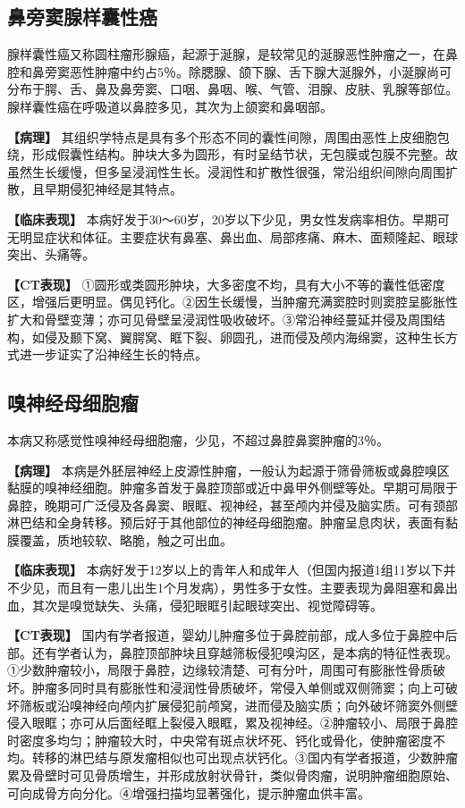 \subsection{鼻旁窦腺样囊性癌}

腺样囊性癌又称圆柱瘤形腺癌，起源于涎腺，是较常见的涎腺恶性肿瘤之一，在鼻腔和鼻旁窦恶性肿瘤中约占5％。除腮腺、颌下腺、舌下腺大涎腺外，小涎腺尚可分布于腭、舌、鼻及鼻旁窦、口咽、鼻咽、喉、气管、泪腺、皮肤、乳腺等部位。腺样囊性癌在呼吸道以鼻腔多见，其次为上颌窦和鼻咽部。

\textbf{【病理】}
其组织学特点是具有多个形态不同的囊性间隙，周围由恶性上皮细胞包绕，形成假囊性结构。肿块大多为圆形，有时呈结节状，无包膜或包膜不完整。故虽然生长缓慢，但多呈浸润性生长。浸润性和扩散性很强，常沿组织间隙向周围扩散，且早期侵犯神经是其特点。

\textbf{【临床表现】}
本病好发于30～60岁，20岁以下少见，男女性发病率相仿。早期可无明显症状和体征。主要症状有鼻塞、鼻出血、局部疼痛、麻木、面颊隆起、眼球突出、头痛等。

\textbf{【CT表现】}
①圆形或类圆形肿块，大多密度不均，具有大小不等的囊性低密度区，增强后更明显。偶见钙化。②因生长缓慢，当肿瘤充满窦腔时则窦腔呈膨胀性扩大和骨壁变薄；亦可见骨壁呈浸润性吸收破坏。③常沿神经蔓延并侵及周围结构，如侵及颞下窝、翼腭窝、眶下裂、卵圆孔，进而侵及颅内海绵窦，这种生长方式进一步证实了沿神经生长的特点。

\subsection{嗅神经母细胞瘤}

本病又称感觉性嗅神经母细胞瘤，少见，不超过鼻腔鼻窦肿瘤的3％。

\textbf{【病理】}
本病是外胚层神经上皮源性肿瘤，一般认为起源于筛骨筛板或鼻腔嗅区黏膜的嗅神经细胞。肿瘤多首发于鼻腔顶部或近中鼻甲外侧壁等处。早期可局限于鼻腔，晚期可广泛侵及各鼻窦、眼眶、视神经，甚至颅内并侵及脑实质。可有颈部淋巴结和全身转移。预后好于其他部位的神经母细胞瘤。肿瘤呈息肉状，表面有黏膜覆盖，质地较软、略脆，触之可出血。

\textbf{【临床表现】}
本病好发于12岁以上的青年人和成年人（但国内报道1组11岁以下并不少见，而且有一患儿出生1个月发病），男性多于女性。主要表现为鼻阻塞和鼻出血，其次是嗅觉缺失、头痛，侵犯眼眶引起眼球突出、视觉障碍等。

\textbf{【CT表现】}
国内有学者报道，婴幼儿肿瘤多位于鼻腔前部，成人多位于鼻腔中后部。还有学者认为，鼻腔顶部肿块且穿越筛板侵犯嗅沟区，是本病的特征性表现。①少数肿瘤较小，局限于鼻腔，边缘较清楚、可有分叶，周围可有膨胀性骨质破坏。肿瘤多同时具有膨胀性和浸润性骨质破坏，常侵入单侧或双侧筛窦；向上可破坏筛板或沿嗅神经向颅内扩展侵犯前颅窝，进而侵及脑实质；向外破坏筛窦外侧壁侵入眼眶；亦可从后面经眶上裂侵入眼眶，累及视神经。②肿瘤较小、局限于鼻腔时密度多均匀；肿瘤较大时，中央常有斑点状坏死、钙化或骨化，使肿瘤密度不均。转移的淋巴结与原发瘤相似也可出现点状钙化。③国内有学者报道，少数肿瘤累及骨壁时可见骨质增生，并形成放射状骨针，类似骨肉瘤，说明肿瘤细胞原始、可向成骨方向分化。④增强扫描均显著强化，提示肿瘤血供丰富。

